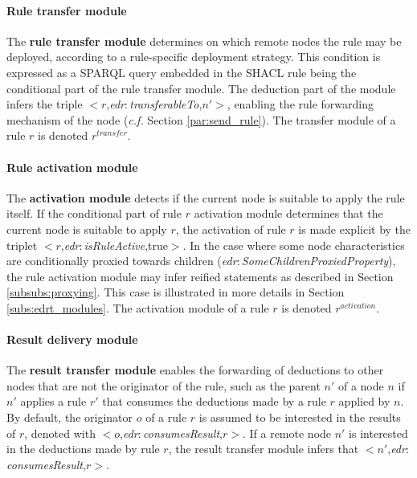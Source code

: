 \documentclass{iosart2c}
\newcommand{\namespace}[1]{\textit{#1$:$}}
\newcommand{\concept}[2]{\namespace{#1}\-\textit{#2}}
\newcommand{\triplet}[3]{$<$#1,\textit{#2},#3$>$}
\begin{document}
\paragraph{Rule transfer module}
The \textbf{rule transfer module} determines on which remote nodes the rule may be deployed, according to a rule-specific deployment strategy.
This condition is expressed as a SPARQL query embedded in the SHACL rule being the conditional part of the rule transfer module.
The deduction part of the module infers the triple \triplet{$r$}{\concept{edr}{transferable\-To}}{$n'$}, enabling the rule forwarding mechanism of the node (\textit{c.f.} Section \textsection \ref{par:send_rule}).
The transfer module of a rule $r$ is denoted $r^{transfer}$.


\paragraph{Rule activation module}
The \textbf{activation module} detects if the current node is suitable to apply the rule itself. 
If the conditional part of rule $r$ activation module determines that the current node is suitable to apply $r$, the activation of rule $r$ is made explicit by the triplet \triplet{$r$}{\concept{edr}{is\-Rule\-Active}}{true}.
In the case where some node characteristics are conditionally proxied towards children (\concept{edr}{Some\-Children\-Proxied\-Property}), the rule activation module may infer reified statements as described in Section \textsection \ref{subsubs:proxying}. 
This case is illustrated in more details in Section \textsection \ref{subs:edrt_modules}.
The activation module of a rule $r$ is denoted $r^{activation}$.

\paragraph{Result delivery module}
The \textbf{result transfer module} enables the forwarding of deductions to other nodes that are not the originator of the rule, such as the parent $n'$ of a node $n$ if $n'$ applies a rule $r'$ that consumes the deductions made by a rule $r$ applied by $n$.
By default, the originator $o$ of a rule $r$ is assumed to be interested in the results of $r$, denoted with \triplet{$o$}{\concept{edr}{consumes\-Result}}{$r$}.
If a remote node $n'$ is interested in the deductions made by rule $r$, the result transfer module infers that \triplet{$n'$}{\concept{edr}{consumes\-Result}}{$r$}.
\end{document}
